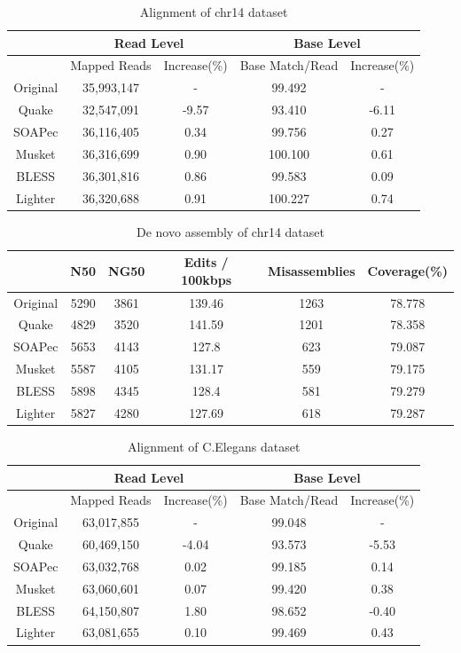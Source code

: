 \documentclass{bmcart}
\begin{document}
\begin{backmatter}
\begin{table}[h!]%
\caption{Alignment of chr14 dataset}
\begin{tabular}{|c|c|c||c|c|}\hline
  & \multicolumn{2}{|c||}{Read Level} & \multicolumn{2}{|c|}{Base Level} \\ \hline
  & Mapped Reads  &Increase(\%) & Base Match/Read	& Increase(\%) \\ \hline
Original & 35,993,147	&- 		&	99.492	& - \\ \hline
Quake 	& 32,547,091	& -9.57 &	93.410	& -6.11 \\ \hline
SOAPec  & 36,116,405  & 0.34 & 99.756 & 0.27 \\ \hline
Musket 	&	36,316,699	& 0.90	& 100.100	& 0.61 \\ \hline
BLESS 	&36,301,816	& 0.86	& 99.583	&	0.09 \\ \hline
Lighter	& 36,320,688 & 0.91	& 100.227	&  0.74 \\ \hline
\end{tabular}
\end{table}

\begin{table}[h!] %
\caption{De novo assembly of chr14 dataset}
\begin{tabular}{|c|c|c|c|c|c|} \hline
	   & N50 &	NG50	& Edits / 100kbps &	Misassemblies	& Coverage(\%) \\ \hline
Original &	5290 & 3861	& 139.46 &1263	& 78.778 \\ \hline
Quake	&	4829 & 3520 & 141.59 & 1201 &	78.358 \\ \hline
SOAPec & 5653	& 4143	& 127.8 &	623	 & 79.087 \\ \hline
Musket	&	5587& 	4105 &	131.17	& 559 &	79.175  \\ \hline
BLESS	&	5898 &	4345 &	128.4	& 581 &	79.279 \\ \hline
Lighter	&	5827 & 4280	& 127.69	& 618 & 79.287 \\ \hline
\end{tabular}
\end{table}

\begin{table}[h!]%
\caption{Alignment of C.Elegans dataset}
\begin{tabular}{|c|c|c||c|c|}\hline
  & \multicolumn{2}{|c||}{Read Level} & \multicolumn{2}{|c|}{Base Level} \\ \hline
  & Mapped Reads  &Increase(\%) & Base Match/Read	& Increase(\%) \\ \hline
Original & 63,017,855	& - 	&	99.048	& - \\ \hline
Quake 	& 60,469,150	& -4.04	&	93.573	& -5.53 \\ \hline
SOAPec  & 63,032,768    & 0.02	& 	99.185	&	0.14 \\ \hline
Musket 	&	63,060,601	&	0.07 &	99.420 & 0.38 \\ \hline
BLESS 	& 64,150,807	& 1.80 &98.652	& -0.40 \\ \hline
Lighter	& 63,081,655	& 0.10	& 99.469 &0.43 \\ \hline
\end{tabular}
\end{table}


\end{backmatter}
\end{document}
